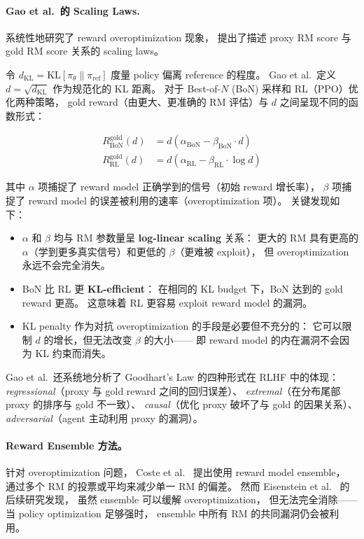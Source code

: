 \paragraph{Gao et al.\ 的 Scaling Laws.}
 系统性地研究了 reward overoptimization 现象，
提出了描述 proxy RM score 与 gold RM score 关系的 scaling laws。

令 $d_{\text{KL}} = \text{KL}[\pi_\theta \| \pi_{\text{ref}}]$ 度量 policy 偏离 reference 的程度。
Gao et al.\ 定义 $d = \sqrt{d_{\text{KL}}}$ 作为规范化的 KL 距离。
对于 Best-of-$N$ (BoN) 采样和 RL（PPO）优化两种策略，
gold reward（由更大、更准确的 RM 评估）与 $d$ 之间呈现不同的函数形式：

\begin{align}
\label{eq:pref:overopt-bon}
R_{\text{BoN}}^{\text{gold}}(d) &= d\left(\alpha_{\text{BoN}} - \beta_{\text{BoN}} \cdot d\right) \\[4pt]
\label{eq:pref:overopt-rl}
R_{\text{RL}}^{\text{gold}}(d) &= d\left(\alpha_{\text{RL}} - \beta_{\text{RL}} \cdot \log d\right)
\end{align}

\noindent
其中 $\alpha$ 项捕捉了 reward model 正确学到的信号（初始 reward 增长率），
$\beta$ 项捕捉了 reward model 的误差被利用的速率（overoptimization 项）。
关键发现如下：

\begin{itemize}[leftmargin=2em]
  \item $\alpha$ 和 $\beta$ 均与 RM 参数量呈 \textbf{log-linear scaling} 关系：
    更大的 RM 具有更高的 $\alpha$（学到更多真实信号）和更低的 $\beta$（更难被 exploit），
    但 overoptimization 永远不会完全消失。
  \item BoN 比 RL 更 \textbf{KL-efficient}：
    在相同的 KL budget 下，BoN 达到的 gold reward 更高。
    这意味着 RL 更容易 exploit reward model 的漏洞。
  \item KL penalty 作为对抗 overoptimization 的手段是必要但不充分的：
    它可以限制 $d$ 的增长，但无法改变 $\beta$ 的大小——
    即 reward model 的内在漏洞不会因为 KL 约束而消失。
\end{itemize}

Gao et al.\ 还系统地分析了 Goodhart's Law 的四种形式在 RLHF 中的体现：
\textit{regressional}（proxy 与 gold reward 之间的回归误差）、
\textit{extremal}（在分布尾部 proxy 的排序与 gold 不一致）、
\textit{causal}（优化 proxy 破坏了与 gold 的因果关系）、
\textit{adversarial}（agent 主动利用 proxy 的漏洞）。

\paragraph{Reward Ensemble 方法。}
针对 overoptimization 问题，
Coste et al.\ \cite{coste2023ensemble} 提出使用 reward model ensemble，
通过多个 RM 的投票或平均来减少单一 RM 的偏差。
然而 Eisenstein et al.\ \cite{eisenstein2023ensemble} 的后续研究发现，
虽然 ensemble 可以缓解 overoptimization，
但无法完全消除——当 policy optimization 足够强时，
ensemble 中所有 RM 的共同漏洞仍会被利用。

